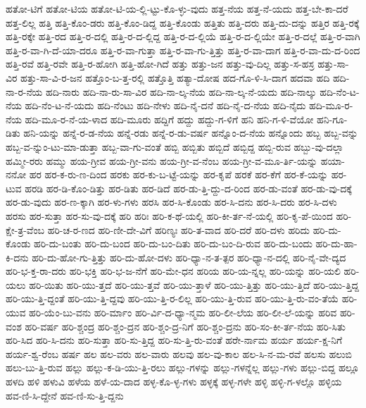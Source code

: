 {ಹತೋ-ಟಿಗೆ
ಹತೋ-ಟಿಯ
ಹತೋ-ಟಿ-ಯ-ಲ್ಲಿ-ಟ್ಟು-ಕೊ-ಳ್ಳು-ವುದು
ಹತ್ತ-ನೆಯ
ಹತ್ತ-ನೆ-ಯದು
ಹತ್ತ-ಬೇ-ಕಾ-ದರೆ
ಹತ್ತ-ಲಿಲ್ಲ
ಹತ್ತಿ
ಹತ್ತಿ-ಕೊಂ-ಡರು
ಹತ್ತಿ-ಕೊಂ-ಡಿದ್ದ
ಹತ್ತಿ-ಕೊಂಡು
ಹತ್ತಿತು
ಹತ್ತಿ-ದರು
ಹತ್ತಿ-ದು-ದನ್ನು
ಹತ್ತಿರ
ಹತ್ತಿ-ರಕ್ಕೆ
ಹತ್ತಿ-ರಕ್ಕೇ
ಹತ್ತಿ-ರದ
ಹತ್ತಿ-ರ-ದಲ್ಲಿ
ಹತ್ತಿ-ರ-ದ-ಲ್ಲಿದ್ದ
ಹತ್ತಿ-ರ-ದ-ಲ್ಲಿಯೆ
ಹತ್ತಿ-ರ-ದ-ಲ್ಲಿಯೇ
ಹತ್ತಿ-ರ-ದಲ್ಲೆ
ಹತ್ತಿ-ರ-ವಾಗಿ
ಹತ್ತಿ-ರ-ವಾ-ಗಿ-ದೆ-ಯಾ-ದರೂ
ಹತ್ತಿ-ರ-ವಾ-ಗುತ್ತಾ
ಹತ್ತಿ-ರ-ವಾ-ಗು-ತ್ತಿತ್ತು
ಹತ್ತಿ-ರ-ವಾ-ದಾಗ
ಹತ್ತಿ-ರ-ವಾ-ದು-ದ-ರಿಂದ
ಹತ್ತಿ-ರವೆ
ಹತ್ತಿ-ರವೇ
ಹತ್ತಿ-ರ-ಹೋಗಿ
ಹತ್ತಿ-ಹೋ-ಗಿದೆ
ಹತ್ತು
ಹತ್ತು-ಜನ
ಹತ್ತು-ವು-ದಿಲ್ಲ
ಹತ್ತು-ಸ-ಹಸ್ರ
ಹತ್ತು-ಸಾ-ವಿರ
ಹತ್ತು-ಸಾ-ವಿ-ರ-ಜನ
ಹತ್ತೊಂ-ಬ-ತ್ತ-ರಲ್ಲಿ
ಹತ್ತೊತ್ತಿ
ಹತ್ಯಾ-ದೋಷ
ಹದ-ಗೊ-ಳಿ-ಸಿ-ದಾಗ
ಹದವಾ
ಹದಿ
ಹದಿ-ನಾ-ರ-ನೆಯ
ಹದಿ-ನಾರು
ಹದಿ-ನಾ-ರು-ಸಾ-ವಿರ
ಹದಿ-ನಾ-ಲ್ಕ-ನೆಯ
ಹದಿ-ನಾ-ಲ್ಕ-ನೆ-ಯದು
ಹದಿ-ನಾಲ್ಕು
ಹದಿ-ನೆಂ-ಟ-ನೆಯ
ಹದಿ-ನೆಂ-ಟ-ನೆ-ಯದು
ಹದಿ-ನೆಂಟು
ಹದಿ-ನೇಳು
ಹದಿ-ನೈ-ದನೆ
ಹದಿ-ನೈ-ದ-ನೆಯ
ಹದಿ-ನೈದು
ಹದಿ-ಮೂ-ರ-ನೆಯ
ಹದಿ-ಮೂ-ರ-ನೆ-ಯ-ಳಾದ
ಹದಿ-ಮೂರು
ಹದ್ದಿಗೆ
ಹದ್ದು
ಹದ್ದು-ಗ-ಳಿಗೆ
ಹನಿ
ಹನಿ-ಗ-ಳಿ-ವೆಯೋ
ಹನಿ-ಗೂ-ಡಿತು
ಹನಿ-ಯನ್ನು
ಹನ್ನೆ-ರ-ಡ-ನೆಯ
ಹನ್ನೆ-ರಡು
ಹನ್ನೆ-ರ-ಡು-ವರ್ಷ
ಹನ್ನೊಂ-ದ-ನೆಯ
ಹನ್ನೊಂದು
ಹಬ್ಬ
ಹಬ್ಬ-ವನ್ನು
ಹಬ್ಬ-ವ-ನ್ನುಂ-ಟು-ಮಾ-ಡುತ್ತಾ
ಹಬ್ಬ-ವಾ-ಗು-ವಂತೆ
ಹಬ್ಬಿ
ಹಬ್ಬಿತು
ಹಬ್ಬಿದೆ
ಹಬ್ಬಿದ್ದ
ಹಬ್ಬಿ-ರುವ
ಹಬ್ಬು-ವು-ದಲ್ಲಾ
ಹಮ್ಮೀ-ರರು
ಹಮ್ಮು
ಹಯ-ಗ್ರೀವ
ಹಯ-ಗ್ರೀ-ವನು
ಹಯ-ಗ್ರೀ-ವ-ನೆಂಬ
ಹಯ-ಗ್ರೀ-ವ-ಮೂ-ರ್ತಿ-ಯನ್ನು
ಹಯಾ-ನನೋ
ಹರ
ಹರ-ಕ-ರು-ಣ-ದಿಂದ
ಹರಕು
ಹರ-ಕು-ಬ-ಟ್ಟೆ-ಯನ್ನು
ಹರ-ಕೃಪೆ
ಹರಕೆ
ಹರ-ಕೆಗೆ
ಹರ-ಕೆ-ಯನ್ನು
ಹರ-ಟುವ
ಹರಡಿ
ಹರ-ಡಿ-ಕೊಂ-ಡಿತ್ತು
ಹರ-ಡಿತು
ಹರ-ಡಿದೆ
ಹರ-ಡು-ತ್ತಿ-ದ್ದು-ದ-ರಿಂದ
ಹರ-ಡು-ವಂತೆ
ಹರ-ಡು-ವು-ದಕ್ಕೆ
ಹರ-ಡು-ವುದು
ಹರ-ಣ-ಕ್ಕಾಗಿ
ಹರ-ಳು-ಗಳು
ಹರಸಿ
ಹರ-ಸಿ-ಕೊಂಡು
ಹರ-ಸಿ-ದನು
ಹರ-ಸಿ-ದರು
ಹರ-ಸಿ-ದಳು
ಹರಸು
ಹರ-ಸುತ್ತಾ
ಹರ-ಸು-ವು-ದಕ್ಕೆ
ಹರಿ
ಹರಿಃ
ಹರಿ-ಕ-ಥೆ-ಯಲ್ಲಿ
ಹರಿ-ಕೀ-ರ್ತ-ನೆ-ಯಲ್ಲಿ
ಹರಿ-ಕೃ-ಪೆ-ಯಿಂದ
ಹರಿ-ಕ್ಷೇ-ತ್ರ-ವೆಂಬ
ಹರಿ-ಚ-ರ-ಣದ
ಹರಿ-ಣೀ-ದೇ-ವಿಗೆ
ಹರಿಣ್ಯಃ
ಹರಿ-ತ-ವಾದ
ಹರಿ-ದರೆ
ಹರಿ-ದಳು
ಹರಿದು
ಹರಿ-ದು-ಕೊಂಡು
ಹರಿ-ದು-ಬಂತು
ಹರಿ-ದು-ಬಂದ
ಹರಿ-ದು-ಬಂ-ದಿತು
ಹರಿ-ದು-ಬಂ-ದಿ-ರುವ
ಹರಿ-ದು-ಬಂದು
ಹರಿ-ದು-ಹಾ-ಕಿ-ದನು
ಹರಿ-ದು-ಹೋ-ಗು-ತ್ತಿತ್ತು
ಹರಿ-ದು-ಹೋ-ದಳು
ಹರಿ-ಧ್ಯಾ-ನ-ತ-ತ್ಪರ
ಹರಿ-ಧ್ಯಾ-ನ-ದಲ್ಲಿ
ಹರಿ-ನೈ-ವೇ-ದ್ಯದ
ಹರಿ-ಭ-ಕ್ತ-ರಾ-ದರು
ಹರಿ-ಭಕ್ತಿ
ಹರಿ-ಭ-ಜ-ನೆಗೆ
ಹರಿ-ಮೇ-ಧನ
ಹರಿಯ
ಹರಿ-ಯ-ನ್ನಲ್ಲ
ಹರಿ-ಯನ್ನು
ಹರಿ-ಯಲಿ
ಹರಿ-ಯಲು
ಹರಿ-ಯಿತು
ಹರಿ-ಯು-ತ್ತದೆ
ಹರಿ-ಯು-ತ್ತವೆ
ಹರಿ-ಯು-ತ್ತಾಳೆ
ಹರಿ-ಯು-ತ್ತಿತ್ತು
ಹರಿ-ಯು-ತ್ತಿದೆ
ಹರಿ-ಯು-ತ್ತಿದ್ದ
ಹರಿ-ಯು-ತ್ತಿ-ದ್ದಂತೆ
ಹರಿ-ಯು-ತ್ತಿ-ದ್ದವು
ಹರಿ-ಯು-ತ್ತಿ-ರ-ಲಿಲ್ಲ
ಹರಿ-ಯು-ತ್ತಿ-ರುವ
ಹರಿ-ಯು-ತ್ತಿ-ರು-ವಂ-ತೆಯೆ
ಹರಿ-ಯುವ
ಹರಿ-ಯೆಂ-ಬು-ವನು
ಹರಿ-ರ್ಮಾಂ
ಹರಿ-ರ್ವಿ-ದ-ಧ್ಯಾ-ನ್ಮಮ
ಹರಿ-ಲೀ-ಲೆಯ
ಹರಿ-ಲೀ-ಲೆ-ಯನ್ನು
ಹರಿವ
ಹರಿ-ವಂಶ
ಹರಿ-ವರ್ಷ
ಹರಿ-ಶ್ಚಂದ್ರ
ಹರಿ-ಶ್ಚಂ-ದ್ರನ
ಹರಿ-ಶ್ಚಂ-ದ್ರ-ನಿಗೆ
ಹರಿ-ಶ್ಚಂ-ದ್ರನು
ಹರಿ-ಸಂ-ಕೀ-ರ್ತ-ನೆಯ
ಹರಿ-ಸಿತು
ಹರಿ-ಸಿದ
ಹರಿ-ಸಿ-ದನು
ಹರಿ-ಸುತ್ತಾ
ಹರಿ-ಸು-ತ್ತಿದ್ದ
ಹರಿ-ಸು-ತ್ತಿ-ರು-ವಂತೆ
ಹರೇ-ರ್ನಾಮ
ಹರ್ಯ
ಹರ್ಯ-ಕ್ಷ-ನಿಗೆ
ಹರ್ಯ-ಶ್ವ-ರೆಂಬ
ಹರ್ಷ
ಹಲ
ಹಲ-ವರು
ಹಲ-ವಾರು
ಹಲವು
ಹಲ-ವು-ಕಾಲ
ಹಲ-ಸಿ-ನ-ಮ-ರವೆ
ಹಲಸು
ಹಲುಬಿ
ಹಲು-ಬು-ತ್ತಿ-ರುವ
ಹಲ್ಲು
ಹಲ್ಲು-ಕ-ಡಿ-ಯು-ತ್ತಿ-ರಲು
ಹಲ್ಲು-ಗಳನ್ನು
ಹಲ್ಲು-ಗಳನ್ನೆಲ್ಲ
ಹಲ್ಲು-ಗಳು
ಹಲ್ಲು-ಬಿದ್ದ
ಹಲ್ಲೂ
ಹಳದಿ
ಹಳಿ
ಹಳುವಿ
ಹಳೆಯ
ಹಳೆ-ಯ-ದಾದ
ಹಳ್ಳ-ಕೊ-ಳ್ಳ-ಗಳು
ಹಳ್ಳಕ್ಕೆ
ಹಳ್ಳ-ಗಳೇ
ಹಳ್ಳಿ
ಹಳ್ಳಿ-ಗ-ಳಲ್ಲೊ
ಹಳ್ಳಿಯ
ಹವ-ಣಿ-ಸಿ-ದ್ದೇನೆ
ಹವ-ಣಿ-ಸು-ತ್ತಿ-ದ್ದನು
}
